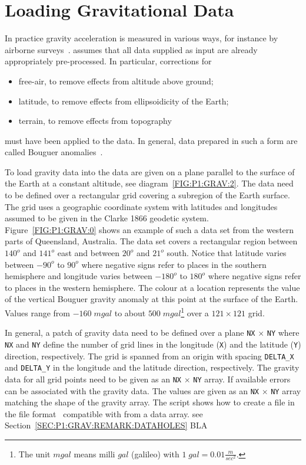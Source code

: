 \section{Loading Gravitational Data}\label{SEC:P1:GRAV:DATA}
In practice gravity acceleration is measured in various ways, for instance by
airborne surveys~\cite{Telford1990a}.
\downunder assumes that all data supplied as input are already appropriately
pre-processed. In particular, corrections for
\begin{itemize}
 \item free-air, to remove effects from altitude above ground;
 \item latitude, to remove effects from ellipsoidicity of the Earth;
 \item terrain, to remove effects from topography
\end{itemize}
must have been applied to the data.
In general, data prepared in such a form are called Bouguer anomalies~\cite{Telford1990a}.

To load gravity data into \downunder the data are given on a plane parallel
to the surface of the Earth at a constant altitude, see
diagram~\ref{FIG:P1:GRAV:2}.
The data need to be defined over a rectangular grid covering a subregion of
the Earth surface.
The grid uses a geographic coordinate system with latitudes and longitudes
assumed to be given in the Clarke 1866 geodetic system.
Figure~\ref{FIG:P1:GRAV:0} shows an example of such a data set from the
western parts of Queensland, Australia.
The data set covers a rectangular region between $140^o$ and $141^o$ east
and between $20^o$ and $21^o$ south.
Notice that latitude varies between $-90^o$ to $90^o$ where negative signs
refer to places in the southern hemisphere and longitude varies between
$-180^o$ to $180^o$ where negative signs refer to places in the western
hemisphere.
The colour at a location represents the value of the vertical Bouguer gravity
anomaly at this point at the surface of the Earth.
Values range from $-160 \; mgal$ to about $500 \; mgal$\footnote{The unit
$mgal$ means milli $gal$ (galileo) with $1 \; gal = 0.01 \frac{m}{sec^2}$.}
over a $121 \times 121$ grid.

In general, a patch of gravity data need to be defined over a plane
\verb|NX| $\times$ \verb|NY| where \verb|NX| and \verb|NY| define the number
of grid lines in the longitude (\verb|X|) and the latitude (\verb|Y|)
direction, respectively.
The grid is spanned from an origin with spacing \verb|DELTA_X| and
\verb|DELTA_Y| in the longitude and the latitude direction, respectively.
The gravity data for all grid points need to be given as an \verb|NX|
$\times$ \verb|NY| array.
If available errors can be associated with the gravity data.
The values are given as an \verb|NX| $\times$ \verb|NY| array matching the
shape of the gravity array.
The \Python script  shows how to create a file
in the \netcdf file format~\cite{NETCDF} compatible with \downunder from
a data array.
see Section~\ref{SEC:P1:GRAV:REMARK:DATAHOLES}
BLA 

